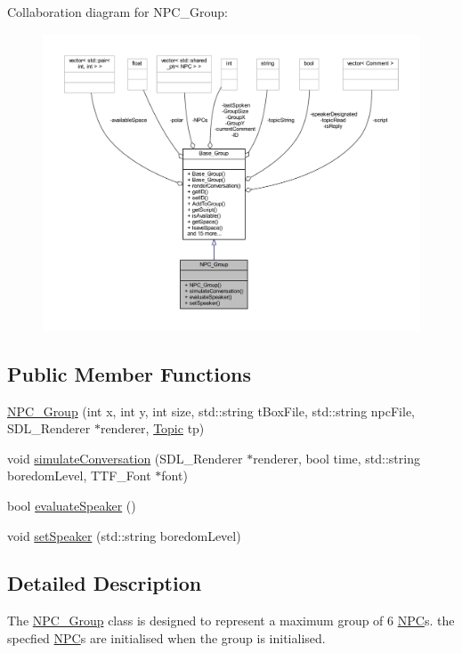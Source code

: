 Collaboration diagram for N\+P\+C\+\_\+\+Group\+:\nopagebreak
\begin{figure}[H]
\begin{center}
\leavevmode
\includegraphics[width=350pt]{class_n_p_c___group__coll__graph}
\end{center}
\end{figure}
\subsection*{Public Member Functions}
\begin{DoxyCompactItemize}
\item 
\hyperlink{class_n_p_c___group_ab680383cc2de42390440bae5bae6b53e}{N\+P\+C\+\_\+\+Group} (int x, int y, int size, std\+::string t\+Box\+File, std\+::string npc\+File, S\+D\+L\+\_\+\+Renderer $\ast$renderer, \hyperlink{class_topic}{Topic} tp)
\item 
void \hyperlink{class_n_p_c___group_a139f16a36dba893743e227ea276fd5e7}{simulate\+Conversation} (S\+D\+L\+\_\+\+Renderer $\ast$renderer, bool time, std\+::string boredom\+Level, T\+T\+F\+\_\+\+Font $\ast$font)
\item 
bool \hyperlink{class_n_p_c___group_a2e0b8772b42985bd7e87359013918601}{evaluate\+Speaker} ()
\item 
void \hyperlink{class_n_p_c___group_a5c1f3d1ad1f50910bb912ed828615ff8}{set\+Speaker} (std\+::string boredom\+Level)
\end{DoxyCompactItemize}


\subsection{Detailed Description}
The \hyperlink{class_n_p_c___group}{N\+P\+C\+\_\+\+Group} class is designed to represent a maximum group of 6 \hyperlink{class_n_p_c}{N\+PC}\textquotesingle{}s. the specfied \hyperlink{class_n_p_c}{N\+PC}\textquotesingle{}s are initialised when the group is initialised. 

